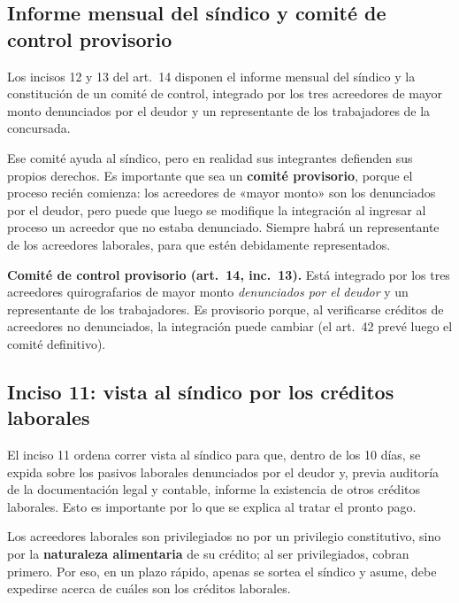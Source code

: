 \documentclass[12pt,oneside]{book}
\begin{document}
\subsection{Informe mensual del síndico y comité de control provisorio}

Los incisos 12 y 13 del art.~14 disponen el informe mensual del síndico y la constitución de un comité de control, integrado por los tres acreedores de mayor monto denunciados por el deudor y un representante de los trabajadores de la concursada.

Ese comité ayuda al síndico, pero en realidad sus integrantes defienden sus propios derechos. Es importante que sea un \textbf{comité provisorio}, porque el proceso recién comienza: los acreedores de «mayor monto» son los denunciados por el deudor, pero puede que luego se modifique la integración al ingresar al proceso un acreedor que no estaba denunciado. Siempre habrá un representante de los acreedores laborales, para que estén debidamente representados.

\begin{important}
\textbf{Comité de control provisorio (art.~14, inc.~13).} Está integrado por los tres acreedores quirografarios de mayor monto \textit{denunciados por el deudor} y un representante de los trabajadores. Es provisorio porque, al verificarse créditos de acreedores no denunciados, la integración puede cambiar (el art.~42 prevé luego el comité definitivo).
\end{important}

\subsection{Inciso 11: vista al síndico por los créditos laborales}

El inciso 11 ordena correr vista al síndico para que, dentro de los 10 días, se expida sobre los pasivos laborales denunciados por el deudor y, previa auditoría de la documentación legal y contable, informe la existencia de otros créditos laborales. Esto es importante por lo que se explica al tratar el pronto pago.

Los acreedores laborales son privilegiados no por un privilegio constitutivo, sino por la \textbf{naturaleza alimentaria} de su crédito; al ser privilegiados, cobran primero. Por eso, en un plazo rápido, apenas se sortea el síndico y asume, debe expedirse acerca de cuáles son los créditos laborales.
\end{document}
